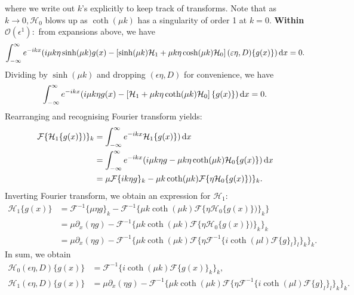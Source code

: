 \documentclass[10pt,reqno,oneside,a4paper]{article}
\begin{document}
where we write out $k$'s explicitly to keep track of transforms. Note that as $k \to 0, \mathcal{H}_0$ blows up as $\coth(\mu k)$ has a singularity of order 1 at $k = 0.$ 
\newline \textbf{Within $\mathcal{O}(\epsilon^1):$} from expansions above, we have 
\begin{align*}
\int_{-\infty}^{\infty} e^{-ikx}( i \mu k \eta \sinh(\mu k) g(x) - \left[ \sinh(\mu k)\mathcal{H}_1 + \mu k \eta \cosh(\mu k) \mathcal{H}_0 \right]( \varepsilon \eta, D)\{ g(x) \}) \,\mathrm{d} x = 0.
\end{align*}
Dividing by $\sinh(\mu k)$ and dropping $( \epsilon \eta, D)$ for convenience, we have 
\begin{align*}
\int_{-\infty}^{\infty} e^{-ikx}( i \mu k \eta g(x) - \left[\mathcal{H}_1 + \mu k \eta \coth(\mu k) \mathcal{H}_0 \right]\{ g(x) \}) \,\mathrm{d} x = 0.
\end{align*}
Rearranging and recognising Fourier transform yields:
\begin{align*}
\mathcal{F} \{\mathcal{H}_1 \{ g(x) \})\}_k &= \int_{-\infty}^{\infty} e^{-ikx}  \mathcal{H}_1 \{ g(x) \}) \,\mathrm{d} x \\
&= \int_{-\infty}^{\infty} e^{-ikx}( i \mu k \eta g  - \mu k \eta \coth(\mu k) \mathcal{H}_0 \{ g(x) \}) \,\mathrm{d} x \\
&= \mu \mathcal{F} \{ i k \eta g \}_k - \mu k \coth(\mu k) \mathcal{F} \{ \eta \mathcal{H}_0 \{ g(x) \}) \}_k.
\end{align*}
Inverting Fourier transform, we obtain an expression for $\mathcal{H}_1:$
\begin{align*}
\mathcal{H}_1 \{ g(x) \} &= \mathcal{F}^{-1} \{ \mu \eta g \}_k - \mathcal{F}^{-1} \{ \mu k \coth(\mu k) \mathcal{F} \{ \eta \mathcal{H}_0 \{ g(x) \}) \}_k \} \\
&= \mu \partial_x(\eta g) - \mathcal{F}^{-1} \{ \mu k \coth(\mu k) \mathcal{F} \{ \eta \mathcal{H}_0 \{ g(x) \}) \}_k \}_k \\
&= \mu \partial_x(\eta g) - \mathcal{F}^{-1} \{ \mu k \coth(\mu k) \mathcal{F} \{ \eta \mathcal{F}^{-1}\{i \coth(\mu l) \mathcal{F}\{g\}_l \}_l \}_k \}_k.
\end{align*}
In sum, we obtain 
\begin{align*}
\mathcal{H}_0( \epsilon \eta, D)\{ g(x) \} &= \mathcal{F}^{-1}\{i \coth(\mu k) \mathcal{F}\{g(x)\}_k \}_k, \\
\mathcal{H}_1( \epsilon \eta, D) \{ g(x) \} &= \mu \partial_x(\eta g) - \mathcal{F}^{-1} \{ \mu k \coth(\mu k) \mathcal{F} \{ \eta \mathcal{F}^{-1}\{i \coth(\mu l) \mathcal{F}\{g\}_l \}_l \}_k \}_k.
\end{align*}
\end{document}
